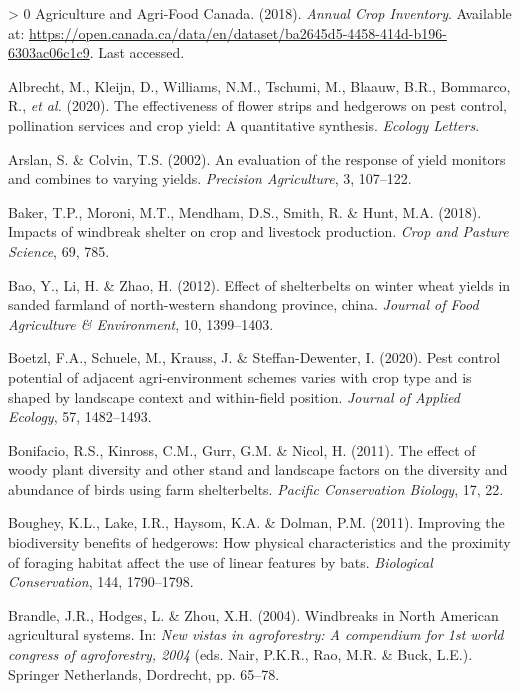 \documentclass[]{elsarticle} %
\newlength{\cslhangindent}
\newenvironment{CSLReferences}[3] %
 {%
  \setlength{\parindent}{0pt}
  \ifodd #1 \everypar{\setlength{\hangindent}{\cslhangindent}}\ignorespaces\fi
  \ifnum #2 > 0
  \setlength{\parskip}{#2\baselineskip}
  \fi
 }%
 {}
\begin{document}
\hypertarget{refs}{}
\begin{CSLReferences}{1}{0}
\leavevmode\hypertarget{ref-AAFC_data}{}%
Agriculture and Agri-Food Canada. (2018). \emph{{Annual Crop Inventory}}. Available at: \url{https://open.canada.ca/data/en/dataset/ba2645d5-4458-414d-b196-6303ac06c1c9}. Last accessed.

\leavevmode\hypertarget{ref-albrecht2020}{}%
Albrecht, M., Kleijn, D., Williams, N.M., Tschumi, M., Blaauw, B.R., Bommarco, R., \emph{et al.} (2020). The effectiveness of flower strips and hedgerows on pest control, pollination services and crop yield: A quantitative synthesis. \emph{Ecology Letters}.

\leavevmode\hypertarget{ref-arslan2002}{}%
Arslan, S. \& Colvin, T.S. (2002). An evaluation of the response of yield monitors and combines to varying yields. \emph{Precision Agriculture}, 3, 107--122.

\leavevmode\hypertarget{ref-baker2018}{}%
Baker, T.P., Moroni, M.T., Mendham, D.S., Smith, R. \& Hunt, M.A. (2018). Impacts of windbreak shelter on crop and livestock production. \emph{Crop and Pasture Science}, 69, 785.

\leavevmode\hypertarget{ref-bao2012}{}%
Bao, Y., Li, H. \& Zhao, H. (2012). Effect of shelterbelts on winter wheat yields in sanded farmland of north-western shandong province, china. \emph{Journal of Food Agriculture \& Environment}, 10, 1399--1403.

\leavevmode\hypertarget{ref-boetzl2020}{}%
Boetzl, F.A., Schuele, M., Krauss, J. \& Steffan-Dewenter, I. (2020). Pest control potential of adjacent agri-environment schemes varies with crop type and is shaped by landscape context and within-field position. \emph{Journal of Applied Ecology}, 57, 1482--1493.

\leavevmode\hypertarget{ref-bonifacio2011}{}%
Bonifacio, R.S., Kinross, C.M., Gurr, G.M. \& Nicol, H. (2011). The effect of woody plant diversity and other stand and landscape factors on the diversity and abundance of birds using farm shelterbelts. \emph{Pacific Conservation Biology}, 17, 22.

\leavevmode\hypertarget{ref-boughey2011}{}%
Boughey, K.L., Lake, I.R., Haysom, K.A. \& Dolman, P.M. (2011). Improving the biodiversity benefits of hedgerows: How physical characteristics and the proximity of foraging habitat affect the use of linear features by bats. \emph{Biological Conservation}, 144, 1790--1798.

\leavevmode\hypertarget{ref-brandle2004}{}%
Brandle, J.R., Hodges, L. \& Zhou, X.H. (2004). Windbreaks in {North American} agricultural systems. In: \emph{New vistas in agroforestry: A compendium for 1st world congress of agroforestry, 2004} (eds. Nair, P.K.R., Rao, M.R. \& Buck, L.E.). Springer Netherlands, Dordrecht, pp. 65--78.


\end{CSLReferences}
\end{document}
